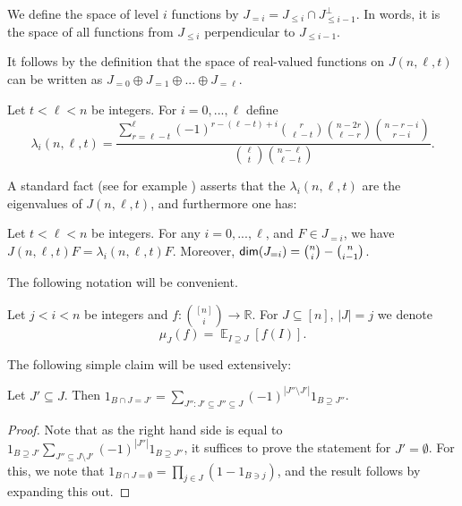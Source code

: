 \documentclass{toc}
\newcommand\card[1]{\left| {#1} \right|}
\newcommand\Expect[2]{{\mathop{\mathbb{E}}_{#1}\left[ {#2} \right]}}
\newcommand\xor{\oplus}
\renewcommand\leq{\leqslant}
\begin{document}
\begin{definition}
We define the space of level $i$ functions by $J_{=i}=J_{\leq i}\cap J_{\leq i-1}^{\bot}$. In words, it
is the space of all functions from $J_{\leq i}$ perpendicular to $J_{\leq i-1}$.
\end{definition}

It follows by the definition that the space of real-valued functions on $J(n,\ell,t)$ can be written as
$J_{=0}\xor J_{=1}\xor ...\xor J_{=\ell}$.

\begin{definition}
Let $t<\ell<n$ be integers. For $i=0,...,\ell$ define
\[
\lambda_i(n,\ell,t) = \frac{\sum\limits_{r=\ell-t}^{\ell}(-1)^{r-(\ell-t)+i}{r\choose \ell-t}{n-2r\choose \ell-r}{n-r-i \choose r-i}}{{\ell\choose t}{n-\ell \choose \ell-t}}.
\]
%
\end{definition}
A standard fact (see for example \cite[Theorem 6.5.2]{Godsil}) asserts that the $\lambda_i(n,\ell,t)$ are the eigenvalues of $J(n,\ell,t)$, and furthermore one has:
\begin{theorem}\label{thm:eigenvecs}
Let $t<\ell<n$ be integers. For any $i=0,...,\ell$, and $F\in J_{=i}$, we have $J(n,\ell,t) F = \lambda_i(n,\ell,t) F$. Moreover,
${\sf dim}(J_{=i}) = \binom{n}{i}-\binom{n}{i-1}$.
\end{theorem}

The following notation will be convenient.
\begin{definition}
Let $j<i<n$ be integers and $f\colon {[n] \choose i}\to\mathbb{R}$. For $J\subseteq [n]$, $\card{J} = j$ we
denote
\[
\mu_{J}(f) = \Expect{I\supseteq J}{f(I)}.
\]
\end{definition}

The following simple claim will be used extensively:
\begin{claim}\label{claim:expand_out_ex}
  Let $J'\subseteq J$. Then $1_{B\cap J = J'} = \sum\limits_{J'':J'\subseteq J''\subseteq J} (-1)^{\card{J''\setminus J'}} 1_{B\supseteq J''}$.
\end{claim}
\begin{proof}
  Note that as the right hand side is equal to $1_{B\supseteq J'} \sum\limits_{J''\subseteq J\setminus J'} (-1)^{\card{J''}} 1_{B\supseteq J''}$, %
  it suffices to prove the statement for $J'=\emptyset$. For this, we note that $1_{B\cap J = \emptyset} = \prod\limits_{j\in J}\left(1-1_{B\ni j}\right)$,
  and the result follows by expanding this out.
\end{proof}
\end{document}
